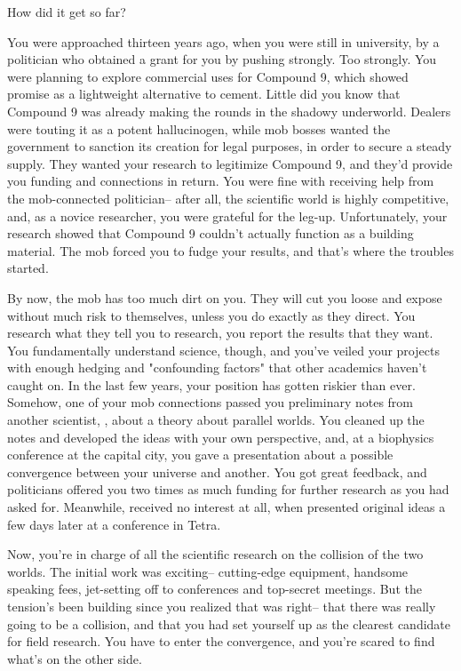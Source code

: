 \documentclass[char]{guildcamp3}
\begin{document}
\name{\cSciOne{}}


\updatemacro{\cNPC}{
  \unknownplayer %
  }

How did it get so far?

You were approached thirteen years ago, when you were still in university, by a politician who obtained a grant for you by pushing strongly. Too strongly. You were planning to explore commercial uses for Compound 9, which showed promise as a lightweight alternative to cement. Little did you know that Compound 9 was already making the rounds in the shadowy underworld. Dealers were touting it as a potent hallucinogen, while mob bosses wanted the government to sanction its creation for legal purposes, in order to secure a steady supply. They wanted your research to legitimize Compound 9, and they'd provide you funding and connections in return. You were fine with receiving help from the mob-connected politician-- after all, the scientific world is highly competitive, and, as a novice researcher, you were grateful for the leg-up. Unfortunately, your research showed that Compound 9 couldn't actually function as a building material. The mob forced you to fudge your results, and that's where the troubles started.

By now, the mob has too much dirt on you. They will cut you loose and expose without much risk to themselves, unless you do exactly as they direct. You research what they tell you to research, you report the results that they want. You fundamentally understand science, though, and you've veiled your projects with enough hedging and "confounding factors" that other academics haven't caught on. In the last few years, your position has gotten riskier than ever. Somehow, one of your mob connections passed you preliminary notes from another scientist, \cScientistTwo, about a theory about parallel worlds. You cleaned up the notes and developed the ideas with your own perspective, and, at a biophysics conference at the capital city, you gave a presentation about a possible convergence between your universe and another. You got great feedback, and politicians offered you two times as much funding for further research as you had asked for. Meanwhile, \cScientistTwo received no interest at all, when \cScientistTwo{\they} presented \cScientistTwo{\their} original ideas a few days later at a conference in Tetra.

Now, you're in charge of all the scientific research on the collision of the two worlds. The initial work was exciting-- cutting-edge equipment, handsome speaking fees, jet-setting off to conferences and top-secret meetings. But the tension's been building since you realized that \cScientistTwo was right-- that there was really going to be a collision, and that you had set yourself up as the clearest candidate for field research. You have to enter the convergence, and you're scared to find what's on the other side.
\end{document}
